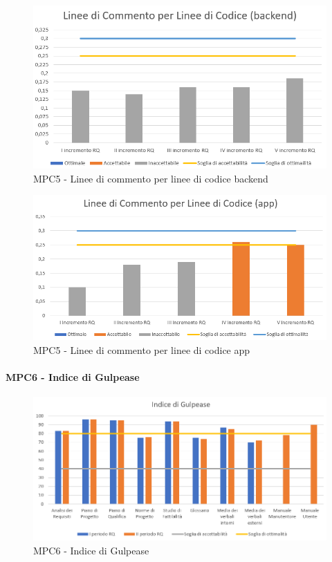   \begin{figure}[h!]
    \centering
      \includegraphics[scale=1]{Immagini/lineeCommLineeCod BE.PNG}
    \caption{MPC5 - Linee di commento per linee di codice backend}
  \end{figure}

  \begin{figure}[h!]
    \centering
      \includegraphics[scale=0.7]{Immagini/lineeCommLineeCod APP.PNG}
    \caption{MPC5 - Linee di commento per linee di codice app}
  \end{figure}



  \clearpage
  \paragraph{MPC6 - Indice di Gulpease}
  \begin{figure}[h!]
    \centering
      \includegraphics[scale=0.8]{Immagini/IndGulp.PNG}
    \caption{MPC6 - Indice di Gulpease}
  \end{figure}



